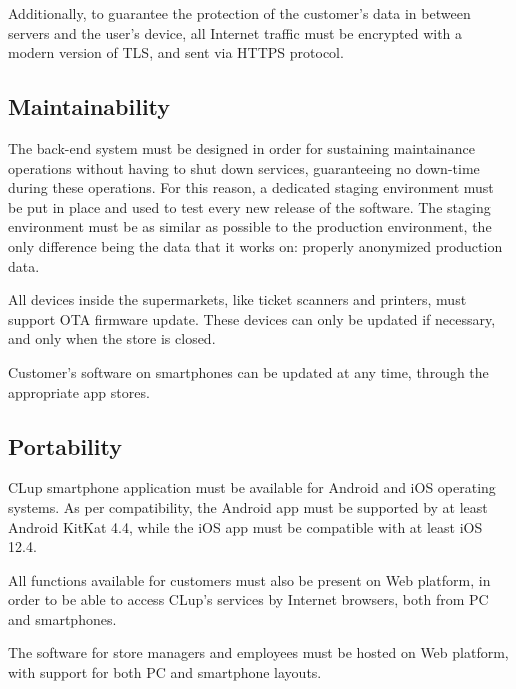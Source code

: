 \documentclass[../../main.tex]{subfiles}
\begin{document}
	Additionally, to guarantee the protection of the customer's data in between servers and the 
	user's device, all Internet traffic must be encrypted with a modern version of TLS, and sent via HTTPS protocol.


	\subsection{Maintainability}

	The back-end system must be designed in order for sustaining maintainance operations without having to 
	shut down services, guaranteeing no down-time during these operations. For this reason, a dedicated staging environment must be put in place and used to test every new release of the software. The staging environment must be as similar as possible to the production environment, the only difference being the data that it works on: properly anonymized production data.

	All devices inside the supermarkets, like ticket scanners and printers, must support OTA firmware update. These devices can only be updated if necessary, and only when the store is closed.

	Customer's software on smartphones can be updated at any time, through the appropriate app stores.

	\subsection{Portability}

	CLup smartphone application must be available for Android and iOS operating systems. As per compatibility, the Android app must be supported by at least Android KitKat 4.4, while the iOS app must be compatible with at least iOS 12.4.

	All functions available for customers must also be present on Web platform, in order to be able to access 
	CLup's services by Internet browsers, both from PC and smartphones.

	The software for store managers and employees must be hosted on Web platform, with support for both PC and smartphone layouts.

	
\end{document}
